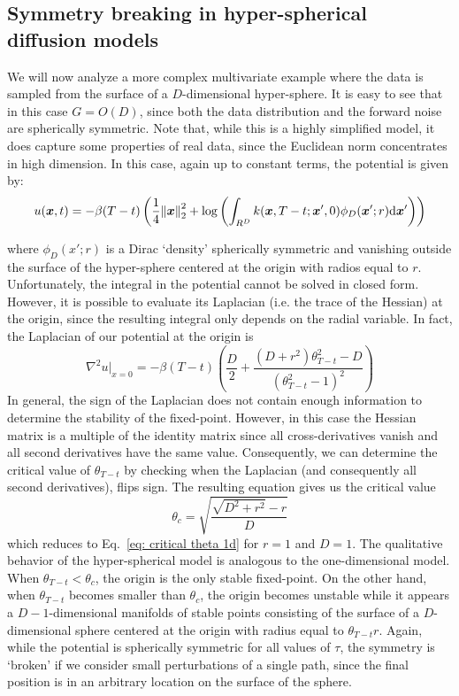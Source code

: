 \subsection{Symmetry breaking in hyper-spherical diffusion models}
\label{supp:hyperspherical}

We will now analyze a more complex multivariate example where the data is sampled from the surface of a $D$-dimensional hyper-sphere. It is easy to see that in this case $G = O(D)$, since both the data distribution and the forward noise are spherically symmetric. Note that, while this is a highly simplified model, it does capture some properties of real data, since the Euclidean norm concentrates in high dimension. In this case, again up to constant terms, the potential is given by:
\begin{equation}
    u(\boldsymbol{x}, t) = -\beta(T - t) \left(\frac{1}{4} {\left\lVert\boldsymbol{x}\right\rVert}_{2}^2 + \log{\left(\int_{R^D} k(\boldsymbol{x}, T-t; \boldsymbol{x}', 0) \phi_D(\boldsymbol{x}'; r) \text{d} \boldsymbol{x}' \right)} \right)
\end{equation}

where $\phi_D(x'; r)$ is a Dirac `density' spherically symmetric and vanishing outside the surface of the hyper-sphere centered at the origin with radios equal to $r$. Unfortunately, the integral in the potential cannot be solved in closed form. However, it is possible to evaluate its Laplacian (i.e. the trace of the Hessian) at the origin, since the resulting integral only depends on the radial variable. In fact, the Laplacian of our potential at the origin is
\begin{equation}
     \nabla^2 u|_{x=0} = -\beta(T - t) \left(\frac{D}{2} +  \frac{(D + r^2) \theta_{T-t}^2 - D}{( \theta_{T-t}^2 - 1)^2} \right)
\end{equation}
In general, the sign of the Laplacian does not contain enough information to determine the stability of the fixed-point. However, in this case the Hessian matrix is a multiple of the identity matrix since all cross-derivatives vanish and all second derivatives have the same value. Consequently, we can determine the critical value of $\theta_{T-t}$ by checking when the Laplacian (and consequently all second derivatives), flips sign. The resulting equation gives us the critical value
\begin{equation}
    \theta_c = \sqrt{\frac{\sqrt{D^2 + r^2} - r}{D}}
\end{equation}
which reduces to Eq.~\ref{eq: critical theta 1d} for $r = 1$ and $D = 1$. The qualitative behavior of the hyper-spherical model is analogous to the one-dimensional model. When $\theta_{T-t} < \theta_c$, the origin is the only stable fixed-point. On the other hand, when $\theta_{T-t}$ becomes smaller than $\theta_c$, the origin becomes unstable while it appears a $D - 1$-dimensional manifolds of stable points consisting of the surface of a $D$-dimensional sphere centered at the origin with radius equal to  $\theta_{T-t} r$. Again, while the potential is spherically symmetric for all values of $\tau$, the symmetry is `broken' if we consider small perturbations of a single path, since the final position is in an arbitrary location on the surface of the sphere.



